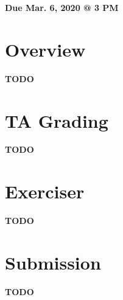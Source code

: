 \documentclass[11pt]{article}
\makeatletter
\def\datedue{Mar. 6, 2020 @ 3 PM}
\makeatother
\begin{document}
\maketitle \thispagestyle{fancy}

\hfill {\large \textbf{Due \datedue}}


\section{Overview}
\label{sec:overview}
\textbf{TODO}

\section{TA Grading}
\label{sec:tagrading}
\textbf{TODO}

\section{Exerciser}
\label{sec:exercise}
\textbf{TODO}

\section{Submission}
\label{sec:submission}
\textbf{TODO}
\end{document}
